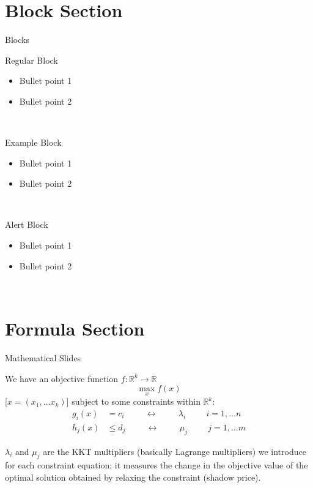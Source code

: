 \documentclass[10pt,aspectratio=169,dvipsnames]{beamer}
\begin{document}
\section{Block Section}
\begin{frame}{Blocks}

\begin{block}{Regular Block}
\begin{itemize}
\item Bullet point 1
\item Bullet point 2
\end{itemize}
~\\
\end{block}

\begin{exampleblock}{Example Block}
\begin{itemize}
\item Bullet point 1
\item Bullet point 2
\end{itemize}
~\\
\end{exampleblock}

\begin{alertblock}{Alert Block}
  \begin{itemize}
  \item Bullet point 1
  \item Bullet point 2
  \end{itemize}
  ~\\
  \end{alertblock}

\end{frame}

\section{Formula Section}

\begin{frame}{Mathematical Slides}


We have an \alert{objective function} $f: \mathbb{R}^k \to \mathbb{R}$
\begin{equation*}
  \max_{x} f(x)
\end{equation*}
[$x = (x_1, \dots x_k)$] subject to some \alert{constraints} within $\mathbb{R}^k$:
\begin{align*}
  g_i(x) & = c_i \hspace{1cm}\leftrightarrow\hspace{1cm} \lambda_i \hspace{1cm} i = 1,\dots n \\
  h_j(x) & \leq d_j \hspace{1cm}\leftrightarrow\hspace{1cm} \mu_j \hspace{1cm} j = 1,\dots m
\end{align*}

$\lambda_i$ and $\mu_j$ are the \alert{KKT multipliers} (basically Lagrange multipliers) we introduce for
each constraint equation; it measures the change in the objective value of the optimal solution obtained by relaxing the constraint (shadow price).

\end{frame}
\end{document}
